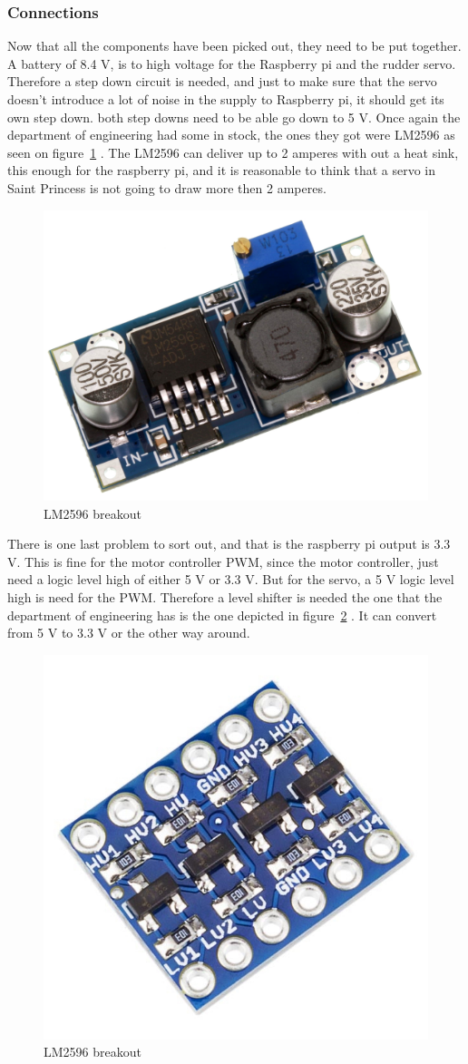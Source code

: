 \subsubsection{Connections}
Now that all the components have been picked out, they need to be put together. 
A battery of 8.4 V, is to high voltage for the Raspberry pi and the rudder servo. Therefore a step down circuit is needed, and just to make sure that the servo doesn't introduce a lot of noise in the supply to Raspberry pi, it should get its own step down. both step downs need to be able go down to 5 V. Once again the department of engineering had some in stock, the ones they got were LM2596 as seen on figure~\ref{fig:stepdown} \cite{stepdown}. The LM2596 can deliver up to 2 amperes with out a heat sink, this enough for the raspberry pi, and it is reasonable to think that a servo in Saint Princess is not going to draw more then 2 amperes.
\begin{figure}[H]
\centering
\includegraphics[width=0.4\linewidth]{Images/Design/stepdown}
\caption{LM2596 breakout}
\label{fig:stepdown}
\end{figure}

There is one last problem to sort out, and that is the raspberry pi output is 3.3 V. This is fine for the motor controller PWM, since the motor controller, just need a logic level high of either 5 V or 3.3 V. But for the servo, a 5 V logic level high is need for the PWM. Therefore a level shifter is needed the one that the department of engineering has is the one depicted in figure~\ref{fig:levelshifter} \cite{levelshifter}. It can convert from 5 V to 3.3 V or the other way around. 

\begin{figure}[H]
\centering
\includegraphics[width=0.3\linewidth]{Images/Design/levelshifter}
\caption{LM2596 breakout}
\label{fig:levelshifter}
\end{figure}

